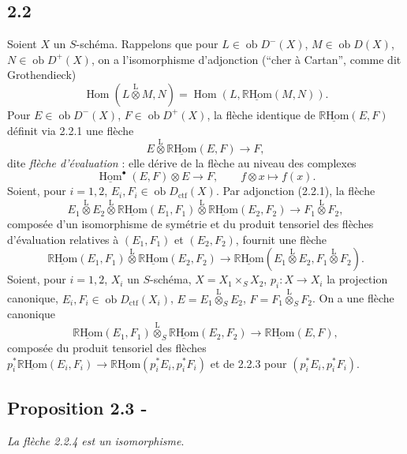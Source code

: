\documentclass[11pt]{article}
\DeclareMathOperator{\Hom}{Hom}
\newcommand{\R}{\mathbb{R}}\newcommand{\RHomCore}{\mathbb{R}\mathrm{Hom}}
\newcommand{\ob}{\operatorname{ob}}
\providecommand{\RHom}{\RHomCore}
\providecommand{\uRHom}{\underline{\RHom}}
\providecommand{\ctf}{\mathrm{ctf}}
\providecommand{\RHom}{\RHomCore}
\providecommand{\Hom}{\operatorname{Hom}}
\providecommand{\ob}{\operatorname{ob}}
\providecommand{\RHom}{\R\mathcal{H}om}
\providecommand{\R}{\mathrm R}
\providecommand{\RHom}{\RHomCore}
\providecommand{\Hom}{\operatorname{Hom}}
\begin{document}
\subsection*{2.2}
Soient $X$ un $S$-schéma. Rappelons que pour $L\in\ob D^{-}(X)$, $M\in\ob D(X)$, $N\in\ob D^{+}(X)$, on a l'isomorphisme d'adjonction (``cher à Cartan'', comme dit Grothendieck)
\begin{equation}\tag{2.2.1}
\Hom(L\overset{\mathrm{L}}{\otimes}M,N)=\Hom(L,\uRHom(M,N)).
\end{equation}
Pour $E\in\ob D^{-}(X)$, $F\in\ob D^{+}(X)$, la flèche identique de $\uRHom(E,F)$ définit via 2.2.1 une flèche
\begin{equation}\tag{2.2.2}
E\overset{\mathrm{L}}{\otimes}\uRHom(E,F)\longrightarrow F,
\end{equation}
dite \emph{flèche d'évaluation} : elle dérive de la flèche au niveau des complexes
\[
\underline{\Hom}^{\bullet}(E,F)\otimes E\longrightarrow F,
\qquad f\otimes x\longmapsto f(x).
\]
Soient, pour $i=1,2$, $E_i,F_i\in\ob D_{\ctf}(X)$. Par adjonction (2.2.1), la flèche
\[
E_1\overset{\mathrm{L}}{\otimes}E_2\overset{\mathrm{L}}{\otimes}\uRHom(E_1,F_1)\overset{\mathrm{L}}{\otimes}\uRHom(E_2,F_2)\longrightarrow F_1\overset{\mathrm{L}}{\otimes}F_2,
\]
composée d'un isomorphisme de symétrie et du produit tensoriel des flèches d'évaluation relatives à $(E_1,F_1)$ et $(E_2,F_2)$, fournit une flèche
\begin{equation}\tag{2.2.3}
\uRHom(E_1,F_1)\overset{\mathrm{L}}{\otimes}\uRHom(E_2,F_2)\longrightarrow\uRHom(E_1\overset{\mathrm{L}}{\otimes}E_2,F_1\overset{\mathrm{L}}{\otimes}F_2).
\end{equation}
Soient, pour $i=1,2$, $X_i$ un $S$-schéma, $X=X_1\times_SX_2$, $p_i:X\to X_i$ la projection canonique, $E_i,F_i\in\ob D_{\ctf}(X_i)$, $E=E_1\overset{\mathrm{L}}{\otimes}_{S}E_2$, $F=F_1\overset{\mathrm{L}}{\otimes}_{S}F_2$. On a une flèche canonique
\begin{equation}\tag{2.2.4}
\uRHom(E_1,F_1)\overset{\mathrm{L}}{\otimes}_{S}\uRHom(E_2,F_2)\longrightarrow\uRHom(E,F),
\end{equation}
composée du produit tensoriel des flèches $p_i^{*}\uRHom(E_i,F_i)\to\uRHom(p_i^{*}E_i,p_i^{*}F_i)$ et de 2.2.3 pour $(p_i^{*}E_i,p_i^{*}F_i)$.

\subsection*{Proposition 2.3 -}
\emph{La flèche 2.2.4 est un isomorphisme}.
\end{document}
